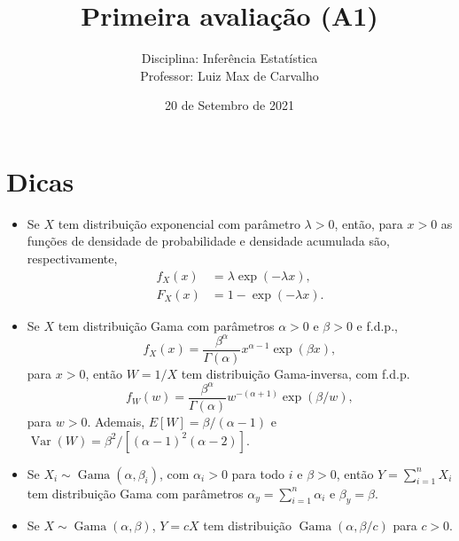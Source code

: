 \documentclass[a4paper,10pt, notitlepage]{report}
\title{Primeira avaliação (A1)}
\author{Disciplina: Inferência Estatística \\ Professor: Luiz Max de Carvalho}
\date{20 de Setembro de 2021}
\newcommand{\vr}{\operatorname{Var}} %
\begin{document}
\maketitle


\begin{center}
\end{center}

\section*{Dicas}
\begin{itemize}
 \item Se $X$ tem distribuição exponencial com parâmetro $\lambda > 0$, então, para $x>0$ as funções de densidade de probabilidade e densidade acumulada são, respectivamente,
 \begin{align*}
 f_X(x) &= \lambda \exp\left(-\lambda x\right),\\
 F_X(x) &= 1 - \exp(-\lambda x).
 \end{align*}
 \item Se $X$ tem distribuição Gama com parâmetros $\alpha >0$ e $\beta >0$ e f.d.p.,
 $$
 f_X(x) = \frac{\beta^\alpha}{\Gamma(\alpha)} x^{\alpha - 1} \exp(\beta x),
 $$
 para $x>0$, então $W = 1/X$ tem distribuição Gama-inversa, com f.d.p.
 $$
 f_W(w) = \frac{\beta^\alpha}{\Gamma(\alpha)} w^{-(\alpha + 1)} \exp(\beta/w),
 $$
 para $w>0$.
 Ademais, $E[W] = \beta/(\alpha - 1)$ e $\vr(W) = \beta^2/[(\alpha-1)^2(\alpha-2)]$.
\item Se $X_i \sim \operatorname{Gama}(\alpha, \beta_i)$, com $\alpha_i >0$  para todo $i$ e $\beta>0$, então $Y = \sum_{i=1}^n X_i$ tem distribuição Gama com parâmetros $\alpha_y = \sum_{i=1}^n \alpha_i$ e $\beta_y = \beta$.
\item Se $X \sim \operatorname{Gama}(\alpha, \beta)$, $Y = cX$ tem distribuição $\operatorname{Gama}(\alpha, \beta/c)$ para $c>0$.
\end{itemize}
 
\end{document}
